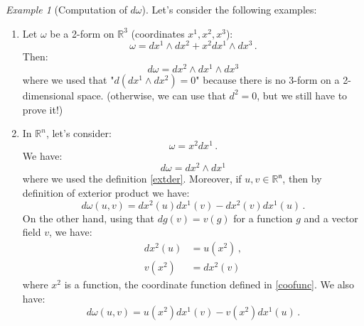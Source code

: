 \documentclass[a4paper,11pt,titlepage, article, oneside]{memoir}
\numberwithin{equation}{section}
\theoremstyle{definition}
\theoremstyle{remark}
\newtheorem{example}[theorem]{Example}
\newcommand{\rfield}{\mathbb{R}}
\begin{document}
\begin{tcolorbox}\begin{example}[Computation of $d\omega$]
  Let's consider the following examples:
  \begin{enumerate}
    \item Let $\omega$ be a 2-form on $\rfield^3$ (coordinates $x^1, x^2, x^3$):
    $$\omega = dx^1 \wedge dx^2 + x^2 dx^1 \wedge dx^3\, .$$
    Then:
    $$d \omega = dx^2 \wedge dx^1 \wedge dx^3$$
    where we used that "$d (dx^1 \wedge dx^2) = 0$" because there is no 3-form on a 2-dimensional space. (otherwise, we can use that $d^2=0$, but we still have to prove it!)
    \item In $\rfield^n$, let's consider:
    $$\omega = x^2 dx^1 \, .$$
    We have:
    $$ d \omega = dx^2 \wedge dx^1$$
    where we used the definition \ref{extder}. Moreover, if $u,v \in \mathfrak{\rfield^n}$, then by definition of exterior product we have:
    $$d \omega (u, v) = dx^2(u)dx^1(v) - dx^2(v)dx^1(u)\, .$$
    On the other hand, using that $d g(v) = v(g)$ for a function $g$ and a vector field $v$, we have:
    \begin{align*}
    dx^2(u)&=u(x^2)\, , \\
    v(x^2) &= dx^2(v)
    \end{align*}
where $x^2$ is a function, the coordinate function defined in \eqref{coofunc}. We also have:
    $$d \omega (u, v) = u(x^2)dx^1(v) - v(x^2)dx^1(u) \, .$$
  \end{enumerate}
\end{example}\end{tcolorbox}
\end{document}
